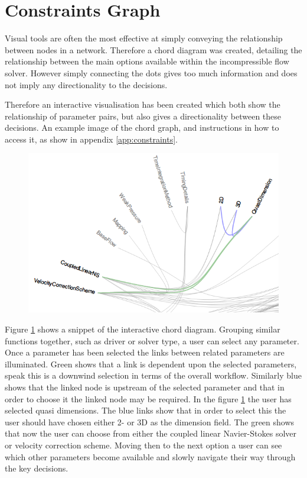 \documentclass[11pt, a4paper]{report}
\begin{document}
\section{Constraints Graph}
\label{sec:constraint_graph}
Visual tools are often the most effective at simply conveying the relationship between nodes in a network. Therefore a chord diagram was created, detailing the relationship between the main options available within the incompressible flow solver. However simply connecting the dots gives too much information and does not imply any directionality to the decisions.

Therefore an interactive visualisation has been created which both show the relationship of parameter pairs, but also gives a directionality between these decisions. An example image of the chord graph, and instructions in how to access it, as show in appendix \ref{app:constraints}.

\begin{figure}[htb!]
 \centering
 \includegraphics[width=.95\linewidth,  clip=true, trim = 0cm 0cm 0cm 0cm]{constraint_directionality}
 \label{fig:constrain_directionality}
\end{figure}

Figure \ref{fig:constrain_directionality} shows a snippet of the interactive chord diagram. Grouping similar functions together, such as driver or solver type, a user can select any parameter. Once a parameter has been selected the links between related parameters are illuminated. Green shows that a link is dependent upon the selected parameters, speak this is a downwind selection in terms of the overall workflow. Similarly blue shows that the linked node is upstream of the selected parameter and that in order to choose it the linked node may be required. In the figure \ref{fig:constrain_directionality} the user has selected quasi dimensions. The blue links show that in order to select this the user should have chosen either 2- or 3D as the dimension field. The green shows that now the user can choose from either the coupled linear Navier-Stokes solver or velocity correction scheme. Moving then to the next option a user can see which other parameters become available and slowly navigate their way through the key decisions.
\end{document}
